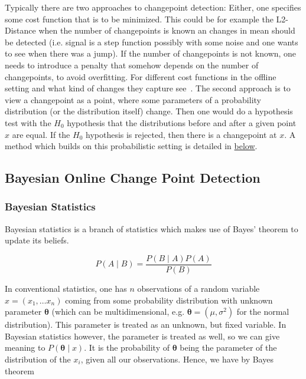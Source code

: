 \documentclass[12pt,a4paper]{article}
\begin{document}
Typically there are two approaches to changepoint detection: Either, one specifies some cost function that is to be minimized. This could be for example the L2-Distance when the number of changepoints is known an changes in mean should be detected (i.e. signal is a step function possibly with some noise and one wants to see when there was a jump). If the number of changepoints is not known, one needs to introduce a penalty that somehow depends on the number of changepoints, to avoid overfitting. For different cost functions in the offline setting and what kind of changes they capture see~\cite{Truong:Selectivereviewoffline}. The second approach is to view a changepoint as a point, where some parameters of a probability distribution (or the distribution itself) change. Then one would do a hypothesis test with the $H_0$ hypothesis that the distributions before and after a given point $x$ are equal. If the $H_0$ hypothesis is rejected, then there is a changepoint at $x$. A method which builds on this probabilistic setting is detailed in \protect\hyperlink{bayesian-online-changepoint-detection}{below}.

\hypertarget{bayesian-online-changepoint-detection}{
\subsection{Bayesian Online Change Point Detection}\label{bayesian-online-changepoint-detection}}

\subsubsection{Bayesian Statistics}
Bayesian statistics is a branch of statistics which makes use of Bayes' theorem to update its beliefs.

\begin{equation*}
P\left(A \mid B\right)=\frac{P\left(B \mid A\right)P\left(A\right)}{P\left(B\right)}
\end{equation*}

In conventional statistics, one has $n$ observations of a random variable $ x = \left(x_1, \dots x_n\right)$ coming from some probability distribution with unknown parameter $\bm{{\theta}}$ (which can be multidimensional, e.g. $\bm{{\theta}}=\left(\mu, \sigma^2 \right)$ for the normal distribution). This parameter is treated as an unknown, but fixed variable. In Bayesian statistics however, the parameter is treated as well, so we can give meaning to $P\left(\bm{{\theta}} \mid x\right)$. It is the probability of $\bm{{\theta}}$ being the parameter of the distribution of the $x_i$, given all our observations. Hence, we have by Bayes theorem
\end{document}
